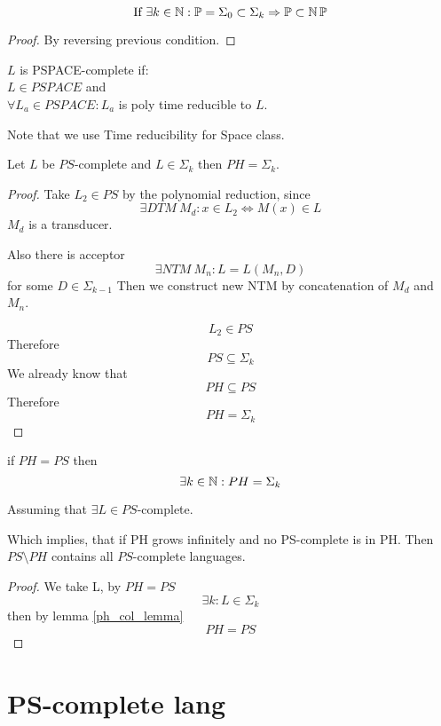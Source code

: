 \begin{consequence}
	\[ \text{If}\ \exists k \in \operatorname{\mathbb{N}}: \operatorname{\mathbb{P}} = \Sigma_0 \subset \Sigma_k \Rightarrow \operatorname{\mathbb{P}} \subset \operatorname{\operatorname{\mathbb{N}}\mathbb{P}} \]
\end{consequence}
\begin{proof}
	By reversing previous condition.
\end{proof}

\begin{definition}
	$L$ is PSPACE-complete if: \\
	$L \in PSPACE$ and\\
	$\forall L_a \in PSPACE: L_a$ is poly time reducible to $L$.

	Note that we use Time reducibility for Space class.
\end{definition}

\begin{lemma}\label{ph_col_lemma}
	Let $L$ be $PS$-complete and $L \in \Sigma_k$ then $PH = \Sigma_k$.
\end{lemma}
\begin{proof}
	Take $L_2 \in PS$ by the polynomial reduction, since
	\[ \exists DTM\ M_d: x \in L_2 \iff M(x) \in L \]
	$M_d$ is a transducer.

	Also there is acceptor
	\[ \exists NTM\ M_n: L = L(M_n, D) \]
	for some $D \in \Sigma_{k - 1}$
	Then we construct new NTM by concatenation of $M_d$ and $M_n$.

	\[ L_2 \in PS \]
	Therefore
	\[ PS \subseteq \Sigma_k \]
	We already know that
	\[ PH \subseteq PS \]
	Therefore
	\[ PH = \Sigma_k \]
\end{proof}

\begin{consequence}
	if $PH = PS$ then
	\[ \exists k \in \operatorname{\mathbb{N}}: PH = \Sigma_k \]

	Assuming that $\exists L \in PS$-complete.

	Which implies, that if PH grows infinitely and no PS-complete is in PH.
	Then $PS \setminus PH$ contains all $PS$-complete languages.
\end{consequence}
\begin{proof}
	We take L, by $PH = PS$
	\[ \exists k: L \in \Sigma_k \]
	then by lemma \cref{ph_col_lemma}
	\[ PH = PS \]
\end{proof}

\section{\texorpdfstring{PS-complete lang}{PS-complete lang}}
\vspace{5mm}
\large

